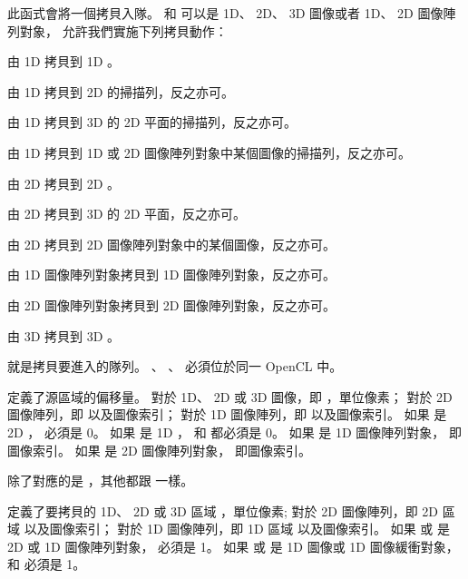 此函式會將一個拷貝入隊。
 和  可以是 1D、 2D、 3D 圖像或者 1D、 2D 圖像陣列對象，
允許我們實施下列拷貝動作：
\startigBase
\item 由 1D 拷貝到 1D 。
\item 由 1D 拷貝到 2D  的掃描列，反之亦可。
\item 由 1D 拷貝到 3D  的 2D 平面的掃描列，反之亦可。
\item 由 1D 拷貝到 1D 或 2D 圖像陣列對象中某個圖像的掃描列，反之亦可。
\item 由 2D 拷貝到 2D 。
\item 由 2D 拷貝到 3D  的 2D 平面，反之亦可。
\item 由 2D 拷貝到 2D 圖像陣列對象中的某個圖像，反之亦可。
\item 由 1D 圖像陣列對象拷貝到 1D 圖像陣列對象，反之亦可。
\item 由 2D 圖像陣列對象拷貝到 2D 圖像陣列對象，反之亦可。
\item 由 3D 拷貝到 3D 。
\stopigBase

 就是拷貝要進入的隊列。
、 、 
必須位於同一 OpenCL 中。

 定義了源區域的偏移量。
對於 1D、 2D 或 3D 圖像，即 ，單位像素；
對於 2D 圖像陣列，即  以及圖像索引；
對於 1D 圖像陣列，即  以及圖像索引。
如果  是 2D ，  必須是 0。
如果  是 1D ，
 和  都必須是 0。
如果  是 1D 圖像陣列對象，  即圖像索引。
如果  是 2D 圖像陣列對象，  即圖像索引。

 除了對應的是 ，其他都跟  一樣。

 定義了要拷貝的 1D、 2D 或 3D 區域 ，單位像素;
對於 2D 圖像陣列，即 2D 區域  以及圖像索引；
對於 1D 圖像陣列，即 1D 區域  以及圖像索引。
如果  或  是 2D  或 1D 圖像陣列對象，
 必須是 1。
如果  或  是 1D 圖像或 1D 圖像緩衝對象，
 和  必須是 1。

